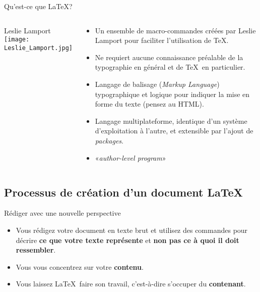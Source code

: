 \begin{frame}{Qu'est-ce que \LaTeX?}
	\begin{columns}
		\begin{HEClegende}{Leslie Lamport}
			\texttt{[image: Leslie\_Lamport.jpg]}
		\end{HEClegende}
		\begin{HECcontenuLegende}
			\begin{itemize}
				\item Un ensemble de macro-commandes créées par Leslie Lamport pour faciliter l'utilisation de \TeX.
				\item Ne requiert aucune connaissance préalable de la typographie en général et de \TeX\ en particulier.
				\item Langage de balisage (\emph{Markup Language}) typographique et logique pour indiquer la mise en forme du texte (pensez au HTML).
				\item Langage multiplateforme, identique d'un système d'exploitation à l'autre, et extensible par l'ajout de \emph{packages}.
				\item «\emph{author-level program}»
			\end{itemize}
		\end{HECcontenuLegende}
	\end{columns}
\end{frame}

\subsection{Processus de création d'un document \LaTeX}

\begin{frame}[c]{Rédiger avec une nouvelle perspective}
	
	\begin{itemize}
		\item Vous rédigez votre document en texte brut et utilisez des commandes pour décrire
			\textbf{ce que votre texte représente} et \textbf{non pas ce à quoi il doit ressembler}.
		\item Vous vous concentrez sur votre \textbf{contenu}.
		\item Vous laissez \LaTeX\ faire son travail, c'est-à-dire s'occuper du \textbf{contenant}.
	\end{itemize}
	
\end{frame}

